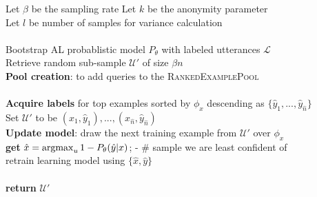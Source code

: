 \documentclass[letterpaper]{article}
\newcommand{\argmax}{\operatornamewithlimits{argmax}}
\begin{document}
\LinesNumbered
\begin{algorithm}[t]
Let $\beta$ be the sampling rate  
Let $k$ be the anonymity parameter \\
Let $l$ be number of samples for variance calculation \\
\hfill \\
 
Bootstrap \textsc{AL} probablistic model $P_\theta$ with labeled utterances $\mathcal{L}$\\
Retrieve random sub-sample $\mathcal{U}'$ of size $\beta n$\\

\textbf{Pool creation}: to add queries to the \textsc{RankedExamplePool}\\
\hfill \\

\textbf{Acquire labels} for top examples sorted by $\phi_x$ descending as $\{\hat{y}_1,...,\hat{y}_{\hat{n}}\}$ \\
Set $\mathcal{U}'$ to be $(x_1,\hat{y}_1),...,(x_{\hat{n}},\hat{y}_{\hat{n}})$ \\
  \textbf{Update model}: draw the next training example from $\mathcal{U}'$ over $\phi_x$\\
\hspace{0.4cm} \textbf{get} $\hat{x} = \argmax_u 1 - P_\theta(\hat{y}|x)$; - \# sample we are least confident of \\
\hspace{0.4cm} retrain learning model using $\{\hat{x},\hat{y}\}$\\

\hfill \\
\textbf{return} $\mathcal{U}'$
 \caption{Privacy-preserving Active Learning}
\end{algorithm}
\end{document}
